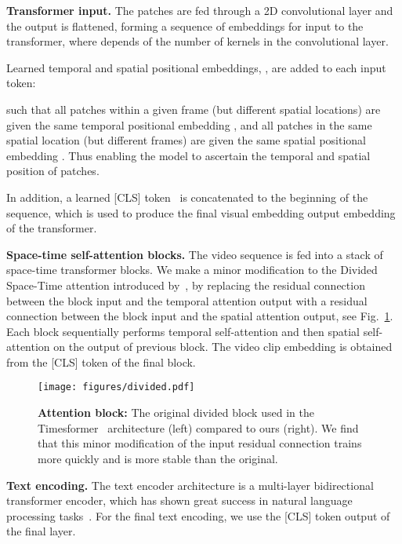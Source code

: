 \documentclass[10pt,twocolumn,letterpaper]{article}
\begin{document}
\noindent\textbf{Transformer input.}
The patches  are fed through a 2D convolutional layer and the output is flattened, forming a sequence of embeddings  for input to the transformer, where  depends of the number of kernels in the convolutional layer.

Learned temporal and spatial positional embeddings, ,  are added to each input token:

such that all patches within a given frame  (but different spatial locations) are given the same temporal positional embedding , and all patches in the same spatial location (but different frames) are given the same spatial positional embedding . Thus enabling the model to ascertain the temporal and spatial position of patches.
 
In addition, a learned [CLS] token~\cite{devlin2019bert} is concatenated to the beginning of the sequence, which is used to produce the final visual embedding output embedding of the transformer.


\noindent\textbf{Space-time self-attention blocks.}
The video sequence is fed into a stack of space-time transformer blocks. We make a minor modification to the Divided Space-Time attention introduced by~\cite{bertasius2021spacetime}, by replacing the residual connection between the block input and the temporal attention output 
with a residual connection between the block input and the spatial attention output, see Fig.~\ref{fig:spacetimeattn}. Each block sequentially performs temporal self-attention and then spatial self-attention on the output of previous block. The video clip embedding is obtained from the [CLS] token of the final block.

\begin{figure}[h]
    \centering
    \texttt{[image: figures/divided.pdf]}
    \caption{\textbf{Attention block:} The original divided block used in the Timesformer~\cite{bertasius2021spacetime} architecture (left) compared to ours (right). We find that this minor modification of the input residual connection trains more quickly and is more stable than the original.}
    \label{fig:spacetimeattn}
\end{figure}

\noindent\textbf{Text encoding.}
The text encoder architecture is a multi-layer bidirectional transformer encoder, which has shown great success in natural language processing tasks~\cite{devlin2019bert}. For the final text encoding, we use the [CLS] token output of the final layer.
\end{document}
